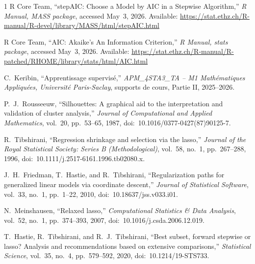 \documentclass[conference,onecolumn]{IEEEtran}
\begin{document}
\begin{thebibliography}{1}
R Core Team,
``stepAIC: Choose a Model by AIC in a Stepwise Algorithm,''
\emph{R Manual, MASS package},
accessed May~3, 2026.
Available: \url{https://stat.ethz.ch/R-manual/R-devel/library/MASS/html/stepAIC.html}

R Core Team,
``AIC: Akaike's An Information Criterion,''
\emph{R Manual, stats package},
accessed May~3, 2026.
Available: \url{https://stat.ethz.ch/R-manual/R-patched/RHOME/library/stats/html/AIC.html}

C.~Keribin,
``Apprentissage supervisé,'' 
\emph{APM\_4STA3\_TA -- M1 Mathématiques Appliquées, Université Paris-Saclay},
supports de cours, Partie II, 2025--2026.

P.~J.~Rousseeuw,
``Silhouettes: A graphical aid to the interpretation and validation of cluster analysis,''
\emph{Journal of Computational and Applied Mathematics}, vol.~20, pp.~53--65, 1987,
doi:~10.1016/0377-0427(87)90125-7.

R.~Tibshirani,
``Regression shrinkage and selection via the lasso,''
\emph{Journal of the Royal Statistical Society: Series B (Methodological)}, vol.~58, no.~1, pp.~267--288, 1996,
doi:~10.1111/j.2517-6161.1996.tb02080.x.

J.~H.~Friedman, T.~Hastie, and R.~Tibshirani,
``Regularization paths for generalized linear models via coordinate descent,''
\emph{Journal of Statistical Software}, vol.~33, no.~1, pp.~1--22, 2010,
doi:~10.18637/jss.v033.i01.

N.~Meinshausen,
``Relaxed lasso,''
\emph{Computational Statistics \& Data Analysis}, vol.~52, no.~1, pp.~374--393, 2007,
doi:~10.1016/j.csda.2006.12.019.

T.~Hastie, R.~Tibshirani, and R.~J.~Tibshirani,
``Best subset, forward stepwise or lasso? Analysis and recommendations based on extensive comparisons,''
\emph{Statistical Science}, vol.~35, no.~4, pp.~579--592, 2020,
doi:~10.1214/19-STS733.
\end{thebibliography}

\clearpage
\appendices

\clearpage

\clearpage

\end{document}
